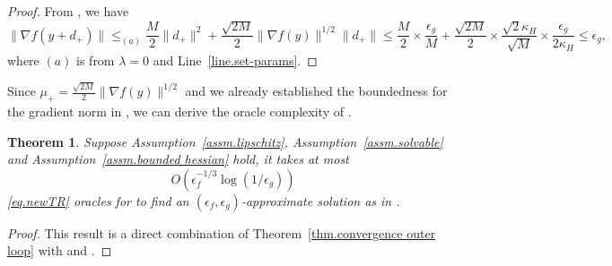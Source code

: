 \documentclass{article}
\newtheorem{theorem}{Theorem}[section]
\numberwithin{equation}{section}
\numberwithin{equation}{section}
\begin{document}
\begin{proof}
    From , we have
    \begin{equation*}
        \|\nabla f(y+d_+)\| \leq_{(a)} \frac{M}{2}\|d_+\|^2 + \frac{\sqrt{2M}}{2}\|\nabla f(y)\|^{1/2}\|d_+\|   \leq \frac{M}{2}\times \frac{\epsilon_g}{M}+\frac{\sqrt{2M}}{2}\times\frac{\sqrt{2}\kappa_H}{\sqrt{M}}\times\frac{\epsilon_g}{2\kappa_H}  \leq \epsilon_g,
    \end{equation*}
    where $(a)$ is from $\lambda=0$ and Line~\ref{line.set-params}.
\end{proof}

Since $\mu_+ = \frac{\sqrt{2M}}{2}\|\nabla f(y)\|^{1/2}$ and we already established the boundedness for the gradient norm in , we can derive the oracle complexity of .
\begin{theorem}
    \label{thm.total complexity newton}
    Suppose Assumption~\ref{assm.lipschitz}, Assumption~\ref{assm.solvable} and Assumption~\ref{assm.bounded hessian} hold, it takes at most
    \begin{equation}\label{eq.total complexity newton}
        O\left (\epsilon_f^{-1/3}\log \left(1/\epsilon_g\right)\right)
    \end{equation}
    \ref{eq.newTR} oracles for  to find an $(\epsilon_f,\epsilon_g)$-approximate solution as in .
\end{theorem}
\begin{proof}
    This result is a direct combination of Theorem~\ref{thm.convergence outer loop} with  and .
\end{proof}
\end{document}
